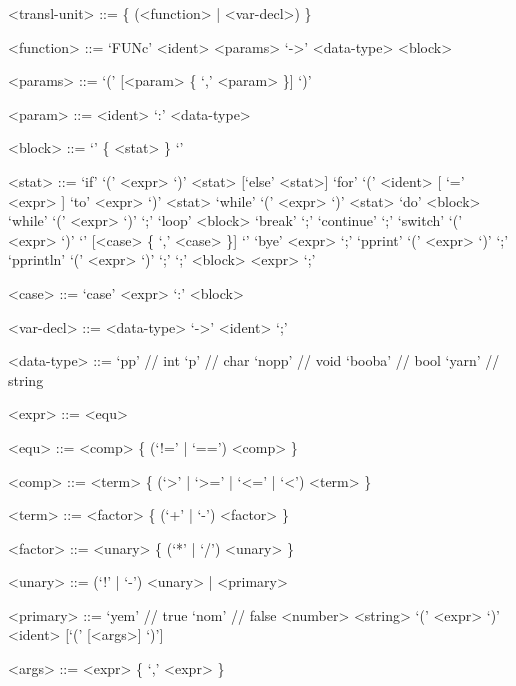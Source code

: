 \documentclass[12pt, a4paper]{article}
\begin{document}
    \setlength{\grammarparsep}{0.6em} %
    \setlength{\grammarindent}{10em} %

    \begin{grammar}

        <transl-unit> ::= \{ (<function> | <var-decl>) \}

        <function> ::= `FUNc' <ident> <params> `->' <data-type> <block>

        <params> ::= `(' [<param> \{ `,' <param> \}] `)'

        <param> ::= <ident> `:' <data-type>

        <block> ::= `{' \{ <stat> \} `}'

        <stat> ::= `if' `(' <expr> `)' <stat> [`else' <stat>]
        \alt `for' `(' <ident> [ `=' <expr> ] `to' <expr> `)' <stat>
        \alt `while' `(' <expr> `)' <stat>
        \alt `do' <block> `while' `(' <expr> `)' `;'
        \alt `loop' <block>
        \alt `break' `;'
        \alt `continue' `;'
        \alt `switch' `(' <expr> `)' `{' [<case> \{ `,' <case> \}] `}'
        \alt `bye' <expr> `;'
        \alt `pprint' `(' <expr> `)' `;'
        \alt `pprintln' `(' <expr> `)' `;'
        \alt `;'
        \alt <block>
        \alt <expr> `;'

        <case> ::= `case' <expr> `:' <block>

        <var-decl> ::= <data-type> `->' <ident> `;'

        <data-type> ::= `pp' // int
        \alt `p' // char
        \alt `nopp' // void
        \alt `booba' // bool
        \alt `yarn' // string

        <expr> ::= <equ>

        <equ> ::= <comp> \{ (`!=' | `==') <comp> \}

        <comp> ::= <term> \{ (`>' | `>=' | `<=' | `<') <term> \}

        <term> ::= <factor> \{ (`+' | `-') <factor> \}

        <factor> ::= <unary> \{ (`*' | `/') <unary> \}

        <unary> ::= (`!' | `-') <unary> | <primary>

        <primary> ::= `yem' // true
        \alt `nom' // false
        \alt <number>
        \alt <string>
        \alt `(' <expr> `)'
        \alt <ident> [`(' [<args>] `)']

        <args> ::= <expr> \{ `,' <expr> \}
    \end{grammar}
\end{document}

